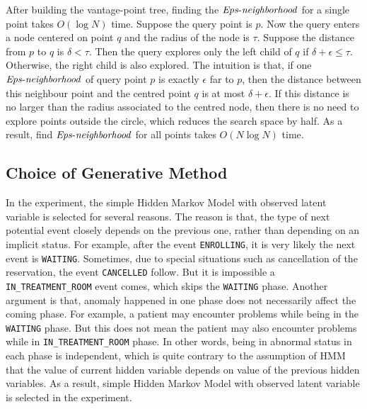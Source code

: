 After building the vantage-point tree, finding the $\id{Eps-neighborhood}$ for a single point takes $O(\log N)$ time. Suppose the query point is $p$. Now the query enters a node centered on point $q$ and the radius of the node is $\tau$. Suppose the distance from $p$ to $q$ is $\delta < \tau$. Then the query explores only the left child of $q$ if $\delta + \epsilon \leq \tau$. Otherwise, the right child is also explored. The intuition is that, if one $\id{Eps-neighborhood}$ of query point $p$ is exactly $\epsilon$ far to $p$, then the distance between this neighbour point and the centred point $q$ is at most $\delta + \epsilon$. If this distance is no larger than the radius associated to the centred node, then there is no need to explore points outside the circle, which reduces the search space by half. As a result, find $\id{Eps-neighborhood}$ for all points takes $O(N \log N)$ time. 

\subsection{Choice of Generative Method}
In the experiment, the simple Hidden Markov Model with observed latent variable is selected for several reasons. The reason is that, the type of next potential event closely depends on the previous one, rather than depending on an implicit status. For example, after the event \texttt{ENROLLING}, it is very likely the next event is \texttt{WAITING}. Sometimes, due to special situations such as cancellation of the reservation, the event \texttt{CANCELLED} follow. But it is impossible a \texttt{IN\_TREATMENT\_ROOM} event comes, which skips the \texttt{WAITING} phase. Another argument is that, anomaly happened in one phase does not necessarily affect the coming phase. For example, a patient may encounter problems while being in the \texttt{WAITING} phase. But this does not mean the patient may also encounter problems while in \texttt{IN\_TREATMENT\_ROOM} phase. In other words, being in abnormal status in each phase is independent, which is quite contrary to the assumption of HMM that the value of current hidden variable depends on value of the previous hidden variables. As a result, simple Hidden Markov Model with observed latent variable is selected in the experiment.

